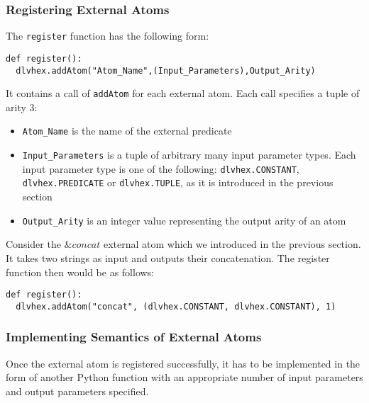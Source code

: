 \documentclass[a4paper, titlepage]{article}
\begin{document}
\subsubsection{Registering External Atoms}
\label{registerExtAtom}
The \verb+register+ function has the following form:
\begin{verbatim} 
def register():
  dlvhex.addAtom("Atom_Name",(Input_Parameters),Output_Arity) 
\end{verbatim}
It contains a call of \verb+addAtom+ for each external atom. Each call specifies a tuple of arity 3:
\begin{itemize}
\item \verb+Atom_Name+ is the name of the 
external predicate
\item \verb+Input_Parameters+ is a tuple of arbitrary many input parameter types. Each input parameter type is one of the 
following: \verb+dlvhex.CONSTANT+, \verb+dlvhex.PREDICATE+ or 
\verb+dlvhex.TUPLE+, as it is introduced in the previous section
\item \verb+Output_Arity+ is an integer value representing the output arity of an atom  
\end{itemize}
Consider the $\mathit{\&concat}$ external atom which we introduced in the previous section. It takes two strings as input and outputs their concatenation. The register function then would be as follows:
\begin{verbatim}
def register():
  dlvhex.addAtom("concat", (dlvhex.CONSTANT, dlvhex.CONSTANT), 1)  
\end{verbatim}

\subsubsection{Implementing Semantics of External Atoms}
Once the external atom is registered successfully, it has 
to be implemented in the form of another Python function 
with an appropriate number of input parameters and output parameters specified.
\end{document}
